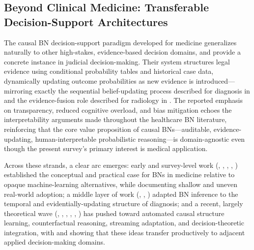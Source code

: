 \subsection{Beyond Clinical Medicine: Transferable Decision-Support Architectures}
The causal BN decision-support paradigm developed for medicine generalizes naturally to other high-stakes, evidence-based decision domains, and \cite{moric2025based} provide a concrete instance in judicial decision-making. Their system structures legal evidence using conditional probability tables and historical case data, dynamically updating outcome probabilities as new evidence is introduced---mirroring exactly the sequential belief-updating process described for diagnosis in \cite{rao2023medical} and the evidence-fusion role described for radiology in \cite{ma2023bayesian}. The reported emphasis on transparency, reduced cognitive overload, and bias mitigation echoes the interpretability arguments made throughout the healthcare BN literature, reinforcing that the core value proposition of causal BNs---auditable, evidence-updating, human-interpretable probabilistic reasoning---is domain-agnostic even though the present survey's primary interest is medical application.

Across these strands, a clear arc emerges: early and survey-level work (\cite{bielza2014bayesian}, \cite{mclachlan2020bayesian}, \cite{amato2013artificial}, \cite{ma2023bayesian}, \cite{geetha2023understanding}) established the conceptual and practical case for BNs in medicine relative to opaque machine-learning alternatives, while documenting shallow and uneven real-world adoption; a middle layer of work (\cite{figueroa2013temporal}, \cite{rao2023medical}, \cite{zhang2026bayesian}) adapted BN inference to the temporal and evidentially-updating structure of diagnosis; and a recent, largely theoretical wave (\cite{gao2026bayesian}, \cite{zhang2026causalg}, \cite{zhang2026dynamic}, \cite{zhang2026causalh}, \cite{zhang2026causaln}, \cite{moreira2025bayesian}) has pushed toward automated causal structure learning, counterfactual reasoning, streaming adaptation, and decision-theoretic integration, with \cite{moreira2025bayesian} and \cite{moric2025based} showing that these ideas transfer productively to adjacent applied decision-making domains.

